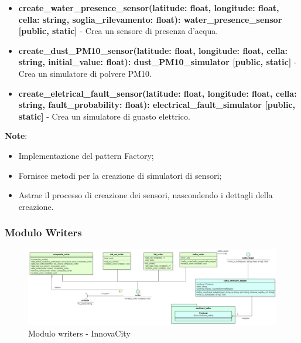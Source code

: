 \begin{itemize}
\begin{itemize}
\begin{itemize}
            \item \textbf{create\_water\_presence\_sensor(latitude: float, longitude: float, cella: string, soglia\_rilevamento: float): water\_presence\_sensor [public, static]} - Crea un sensore di presenza d'acqua.
            
            \item \textbf{create\_dust\_PM10\_sensor(latitude: float, longitude: float, cella: string, initial\_value: float): dust\_PM10\_simulator [public, static]} - Crea un simulatore di polvere PM10.
            
            \item \textbf{create\_eletrical\_fault\_sensor(latitude: float, longitude: float, cella: string, fault\_probability: float): electrical\_fault\_simulator [public, static]} - Crea un simulatore di guasto elettrico.
        \end{itemize}
    \textbf{Note}:
        \begin{itemize}
            \item Implementazione del pattern Factory;
            \item Fornisce metodi per la creazione di simulatori di sensori;
            \item Astrae il processo di creazione dei sensori, nascondendo i dettagli della creazione.
        \end{itemize}
    \end{itemize}
\end{itemize}

\subsubsection{Modulo Writers} \label{sec:writersModule}

\begin{figure}[H]
    \centering
    \includegraphics[width=1.1\textwidth]{../Images/SpecificaTecnica/writerModule.PNG}
    \caption{Modulo writers - InnovaCity}
    \label{fig: writersModule}
\end{figure}

